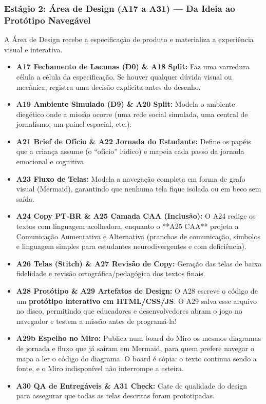 \documentclass[11pt,a4paper]{article}
\begin{document}
\subsubsection{Estágio 2: Área de Design (A17 a A31) --- Da Ideia ao Protótipo Navegável}
A Área de Design recebe a especificação de produto e materializa a experiência visual e interativa.
\begin{itemize}
  \item \textbf{A17 Fechamento de Lacunas (D0) \& A18 Split:} Faz uma varredura célula a célula da especificação. Se houver qualquer dúvida visual ou mecânica, registra uma decisão explícita antes do desenho.
  \item \textbf{A19 Ambiente Simulado (D9) \& A20 Split:} Modela o ambiente diegético onde a missão ocorre (uma rede social simulada, uma central de jornalismo, um painel espacial, etc.).
  \item \textbf{A21 Brief de Ofício \& A22 Jornada do Estudante:} Define os papéis que a criança assume (o ``ofício'' lúdico) e mapeia cada passo da jornada emocional e cognitiva.
  \item \textbf{A23 Fluxo de Telas:} Modela a navegação completa em forma de grafo visual (Mermaid), garantindo que nenhuma tela fique isolada ou em beco sem saída.
  \item \textbf{A24 Copy PT-BR \& A25 Camada CAA (Inclusão):} O A24 redige os textos com linguagem acolhedora, enquanto o **A25 CAA** projeta a Comunicação Aumentativa e Alternativa (pranchas de comunicação, símbolos e linguagem simples para estudantes neurodivergentes e com deficiência).
  \item \textbf{A26 Telas (Stitch) \& A27 Revisão de Copy:} Geração das telas de baixa fidelidade e revisão ortográfica/pedagógica dos textos finais.
  \item \textbf{A28 Protótipo \& A29 Artefatos de Design:} O A28 escreve o código de um \textbf{protótipo interativo em HTML/CSS/JS}. O A29 salva esse arquivo no disco, permitindo que educadores e desenvolvedores abram o jogo no navegador e testem a missão antes de programá-la!
  \item \textbf{A29b Espelho no Miro:} Publica num board do Miro os mesmos diagramas de jornada e fluxo que já saíram em Mermaid, para quem prefere navegar o mapa a ler o código do diagrama. O board é cópia: o texto continua sendo a fonte, e o Miro indisponível não interrompe a esteira.
  \item \textbf{A30 QA de Entregáveis \& A31 Check:} Gate de qualidade do design para assegurar que todas as telas descritas foram prototipadas.
\end{itemize}
\end{document}
